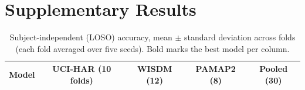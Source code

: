 \documentclass[11pt,a4paper]{article}
\begin{document}



\appendix
\section{Supplementary Results}

\begin{table}[h]
\centering
\caption{Subject-independent (LOSO) accuracy, mean $\pm$ standard deviation across folds (each fold averaged over five seeds). Bold marks the best model per column.}
\label{tab:acc}
\small
\begin{tabular}{lcccc}
\toprule
Model & UCI-HAR (10 folds) & WISDM (12) & PAMAP2 (8) & Pooled (30) \\
\midrule

\bottomrule
\end{tabular}
\end{table}
\end{document}
